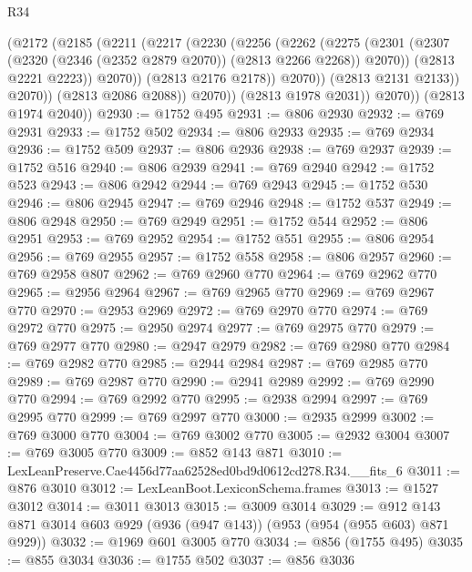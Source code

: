 \begin{lexlean}{R34}
\begin{coremodule}
                    (@2172
                      (@2185
                        (@2211
                          (@2217
                            (@2230
                              (@2256
                                (@2262
                                  (@2275
                                    (@2301
                                      (@2307
                                        (@2320 (@2346 (@2352 @2879 @2070)) (@2813 @2266 @2268))
                                        @2070))
                                    (@2813 @2221 @2223))
                                  @2070))
                              (@2813 @2176 @2178))
                            @2070))
                        (@2813 @2131 @2133))
                      @2070))
                  (@2813 @2086 @2088))
                @2070))
            (@2813 @1978 @2031))
          @2070))
      (@2813 @1974 @2040))
@2930 := @1752 @495
@2931 := @806 @2930
@2932 := @769 @2931
@2933 := @1752 @502
@2934 := @806 @2933
@2935 := @769 @2934
@2936 := @1752 @509
@2937 := @806 @2936
@2938 := @769 @2937
@2939 := @1752 @516
@2940 := @806 @2939
@2941 := @769 @2940
@2942 := @1752 @523
@2943 := @806 @2942
@2944 := @769 @2943
@2945 := @1752 @530
@2946 := @806 @2945
@2947 := @769 @2946
@2948 := @1752 @537
@2949 := @806 @2948
@2950 := @769 @2949
@2951 := @1752 @544
@2952 := @806 @2951
@2953 := @769 @2952
@2954 := @1752 @551
@2955 := @806 @2954
@2956 := @769 @2955
@2957 := @1752 @558
@2958 := @806 @2957
@2960 := @769 @2958 @807
@2962 := @769 @2960 @770
@2964 := @769 @2962 @770
@2965 := @2956 @2964
@2967 := @769 @2965 @770
@2969 := @769 @2967 @770
@2970 := @2953 @2969
@2972 := @769 @2970 @770
@2974 := @769 @2972 @770
@2975 := @2950 @2974
@2977 := @769 @2975 @770
@2979 := @769 @2977 @770
@2980 := @2947 @2979
@2982 := @769 @2980 @770
@2984 := @769 @2982 @770
@2985 := @2944 @2984
@2987 := @769 @2985 @770
@2989 := @769 @2987 @770
@2990 := @2941 @2989
@2992 := @769 @2990 @770
@2994 := @769 @2992 @770
@2995 := @2938 @2994
@2997 := @769 @2995 @770
@2999 := @769 @2997 @770
@3000 := @2935 @2999
@3002 := @769 @3000 @770
@3004 := @769 @3002 @770
@3005 := @2932 @3004
@3007 := @769 @3005 @770
@3009 := @852 @143 @871
@3010 := LexLeanPreserve.Cae4456d77aa62528ed0bd9d0612cd278.R34.__fits_6
@3011 := @876 @3010
@3012 := LexLeanBoot.LexiconSchema.frames
@3013 := @1527 @3012
@3014 := @3011 @3013
@3015 := @3009 @3014
@3029 := @912 @143 @871 @3014 @603 @929 (@936 (@947 @143)) (@953 (@954 (@955 @603) @871 @929))
@3032 := @1969 @601 @3005 @770
@3034 := @856 (@1755 @495)
@3035 := @855 @3034
@3036 := @1755 @502
@3037 := @856 @3036

\end{coremodule}
\end{lexlean}
